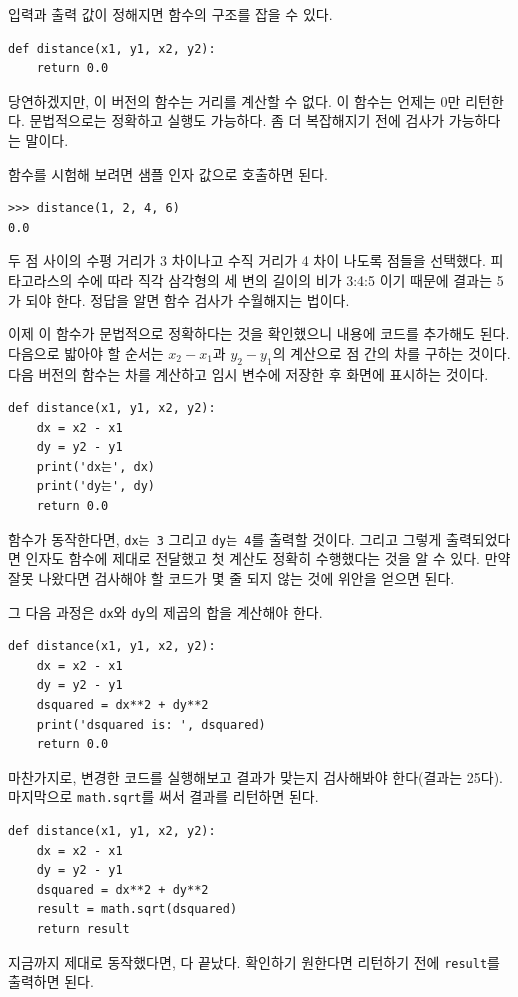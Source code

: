 \documentclass[10pt]{book}
\begin{document}
입력과 출력 값이 정해지면 함수의 구조를 잡을 수 있다. 

\begin{verbatim}
def distance(x1, y1, x2, y2):
    return 0.0
\end{verbatim}
%
당연하겠지만, 이 버전의 함수는 거리를 계산할 수 없다.  이 함수는 언제는
0만 리턴한다.  문법적으로는 정확하고 실행도 가능하다.  좀 더 복잡해지기
전에 검사가 가능하다는 말이다.

함수를 시험해 보려면 샘플 인자 값으로 호출하면 된다. 


\begin{verbatim}
>>> distance(1, 2, 4, 6)
0.0
\end{verbatim}
%
두 점 사이의 수평 거리가 3 차이나고 수직 거리가 4 차이 나도록 점들을
선택했다.  피타고라스의 수에 따라 직각 삼각형의 세 변의 길이의 비가
3:4:5 이기 때문에 결과는 5가 되야 한다.  정답을 알면 함수 검사가
수월해지는 법이다.

이제 이 함수가 문법적으로 정확하다는 것을 확인했으니 내용에 코드를
추가해도 된다.  다음으로 밟아야 할 순서는 $x_2 - x_1$과 $y_2 - y_1$의
계산으로 점 간의 차를 구하는 것이다.  다음 버전의 함수는 차를 계산하고
임시 변수에 저장한 후 화면에 표시하는 것이다.


\begin{verbatim}
def distance(x1, y1, x2, y2):
    dx = x2 - x1
    dy = y2 - y1
    print('dx는', dx)
    print('dy는', dy)
    return 0.0
\end{verbatim}
%
함수가 동작한다면, \verb"dx는 3" 그리고 \verb"dy는 4"를 출력할 것이다.  그리고 그렇게 출력되었다면 인자도 함수에 제대로 전달했고 첫 계산도 정확히 수행했다는 것을 알 수 있다.  만약 잘못 나왔다면 검사해야 할 코드가 몇 줄 되지 않는 것에 위안을 얻으면 된다.

그 다음 과정은 {\tt dx}와 {\tt dy}의 제곱의 합을 계산해야 한다. 

\begin{verbatim}
def distance(x1, y1, x2, y2):
    dx = x2 - x1
    dy = y2 - y1
    dsquared = dx**2 + dy**2
    print('dsquared is: ', dsquared)
    return 0.0
\end{verbatim}
%
마찬가지로, 변경한 코드를 실행해보고 결과가 맞는지 검사해봐야
한다(결과는 25다).  마지막으로 {\tt math.sqrt}를 써서 결과를 리턴하면
된다.

\begin{verbatim}
def distance(x1, y1, x2, y2):
    dx = x2 - x1
    dy = y2 - y1
    dsquared = dx**2 + dy**2
    result = math.sqrt(dsquared)
    return result
\end{verbatim}
%
지금까지 제대로 동작했다면, 다 끝났다.  확인하기 원한다면 리턴하기 전에
{\tt result}를 출력하면 된다. 
\end{document}

